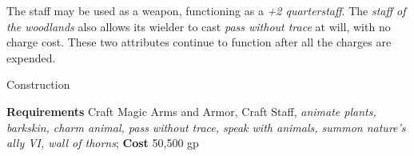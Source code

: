 The staff may be used as a weapon, functioning as a \textit{+2 quarterstaff}. The \textit{staff of the woodlands} also allows its wielder to cast \textit{pass without trace} at will, with no charge cost. These two attributes continue to function after all the charges are expended. 
				
Construction
				
\textbf{Requirements} Craft Magic Arms and Armor, Craft Staff, \textit{animate plants, barkskin, charm animal, pass without trace, speak with animals, summon nature's ally VI, wall of thorns}; \textbf{Cost }50,500 gp
        	
